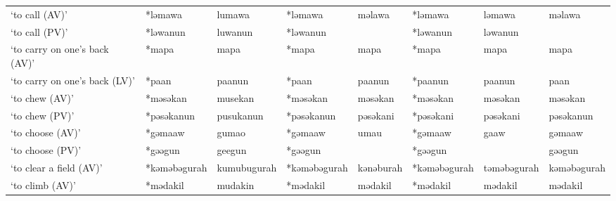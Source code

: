 \begin{landscape}
\begin{longtable}[c]{@{}p{3cm}<{\raggedright}p{2.75cm}<{\raggedright}p{2.75cm}<{\raggedright}p{2.75cm}<{\raggedright}p{2.75cm}<{\raggedright}p{2.75cm}<{\raggedright}p{2.75cm}<{\raggedright}p{2.75cm}<{\raggedright}@{}}
`to call (AV)'                                       & *ləmawa      & lumawa                        & *ləmawa        & məlawa                     & *ləmawa          & ləmawa                   & məlawa                            \\
`to call (PV)'                                       & *ləwanun     & luwanun                       & *ləwanun       &                            & *ləwanun         & ləwanun                  &                                   \\
`to carry on one's back (AV)'                        & *mapa        & mapa                          & *mapa          & mapa                       & *mapa            & mapa                     & mapa                              \\
`to carry on one's back (LV)'                        & *paan        & paanun                        & *paan          & paanun                     & *paanun          & paanun                   & paan                              \\
`to chew (AV)'                                       & *məsəkan     & musekan                       & *məsəkan       & məsəkan                    & *məsəkan         & məsəkan                  & məsəkan                           \\
`to chew (PV)'                                       & *pəsəkanun   & pusukanun                     & *pəsəkanun     & pəsəkani                   & *pəsəkani        & pəsəkani                 & pəsəkanun                         \\
`to choose (AV)'                                     & *gəmaaw      & gumao                         & *gəmaaw        & umau                       & *gəmaaw          & gaaw                     & gəmaaw                            \\
`to choose (PV)'                                     & *gəəgun      & geegun                        & *gəəgun        &                            & *gəəgun          &                          & gəəgun                            \\
`to clear a field (AV)'                              & *kəməbəgurah & kumubugurah                   & *kəməbəgurah   & kənəburah                  & *kəməbəgurah     & təməbəgurah              & kəməbəgurah                       \\
`to climb (AV)'                                      & *mədakil     & mudakin                       & *mədakil       & mədakil                    & *mədakil         & mədakil                  & mədakil                           \\

\end{longtable}
\end{landscape}
